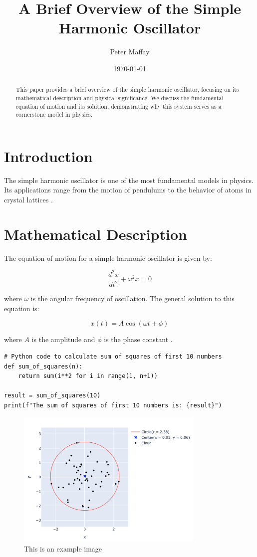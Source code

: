 \documentclass{article}  %
\title{A Brief Overview of the Simple Harmonic Oscillator}
\author{Peter Maffay}
\date{\today}
\begin{document}
\maketitle

\thispagestyle{fancy}

\begin{abstract}
This paper provides a brief overview of the simple harmonic oscillator,
focusing on its mathematical description and physical significance. We discuss
the fundamental equation of motion and its solution, demonstrating why this
system serves as a cornerstone model in physics.
\end{abstract}

\section{Introduction}
The simple harmonic oscillator is one of the most fundamental models in physics.
Its applications range from the motion of pendulums to the behavior of atoms
in crystal lattices \citep{feynman1963}.

\section{Mathematical Description}
The equation of motion for a simple harmonic oscillator is given by:

\begin{equation}
    \frac{d^2x}{dt^2} + \omega^2x = 0
\end{equation}

where $\omega$ is the angular frequency of oscillation. The general solution
to this equation is:

\begin{equation}
    x(t) = A\cos(\omega t + \phi)
\end{equation}

where $A$ is the amplitude and $\phi$ is the phase constant
\citep{goldstein2002}.

\begin{lstlisting}
# Python code to calculate sum of squares of first 10 numbers
def sum_of_squares(n):
    return sum(i**2 for i in range(1, n+1))

result = sum_of_squares(10)
print(f"The sum of squares of first 10 numbers is: {result}")
\end{lstlisting}

\begin{figure}[h]
    \centering
    \includegraphics[width=0.8\textwidth]{graph.png} %
    \caption{This is an example image}
    \label{fig:example}
\end{figure}



\end{document}
